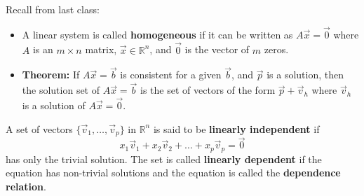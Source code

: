 \documentclass[12pt,letterpaper]{article}
\begin{document}
\thispagestyle{fancy}

Recall from last class:

\begin{itemize}

\item A linear system is called {\bf homogeneous} if it can be written as $A\vec{x}=\vec{0}$ where $A$ is an $m \times n$ matrix, $\vec{x} \in \mathbb{R}^n$, and $\vec{0}$ is the vector of $m$ zeros. 
\item {\bf Theorem:} If $A\vec{x} =\vec{b}$ is consistent for a given $\vec{b}$, and $\vec{p}$ is a solution, then the solution set of $A\vec{x}=\vec{b}$ is the set of vectors of the form $\vec{p}+\vec{v}_h$ where $\vec{v}_h$ is a solution of $A\vec{x} =\vec{0}$.
\end{itemize}

\newpage

\begin{defn}
A set of vectors $\{ \vec{v}_1, \dots, \vec{v}_p\}$ in $\mathbb{R}^n$ is said to be {\bf linearly independent} if $$x_1 \vec{v}_1 +x_2 \vec{v}_2 +\dots +x_p \vec{v}_p = \vec{0}$$ has only the trivial solution. The set is called {\bf linearly dependent} if the equation has non-trivial solutions and the equation is called the {\bf dependence relation}.
\end{defn}
\end{document}

